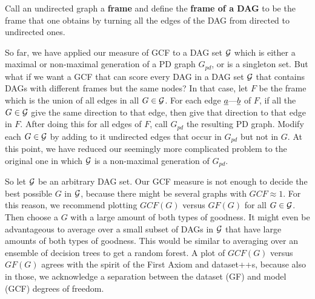 \documentclass[12pt]{article}
\begin{document}
Call an undirected graph a {\bf frame}
and define the
{\bf frame of a DAG}
to be the frame that one obtains
by turning
all the edges of the DAG from directed 
to undirected ones.

So far, we 
have applied our measure of
GCF to a DAG set ${\cal G}$
which is
either a maximal or 
non-maximal generation
of  a PD graph $G_{pd}$,
or is a singleton set.
But what if we want a GCF
that can score every DAG
in a  DAG set
${\cal G}$ that contains
DAGs with different frames
but the same nodes?
In that case, 
let $F$
be the frame
which 
is the union of 
all edges in all $G\in {\cal G}$.
For each edge ${\underline{a}}\text{---}{\underline{b}}$ of $F$,
if all the $G\in {\cal G}$
give the same direction
to that edge, then give that direction
to that edge in $F$.
After doing this for
all edges of $F$,
call $G_{pd} $ the resulting 
PD graph.
Modify each $G\in {\cal G}$
by adding to it undirected edges
that occur in $G_{pd}$
but not in $G$.
At this point,
we have reduced our
seemingly more 
complicated problem
to the original one
in which ${\cal G}$
is a non-maximal 
generation of $G_{pd}$.



So let ${\cal G}$
be an arbitrary DAG set.
Our GCF  measure
is not enough to
decide the best 
possible $G$ in ${\cal G}$,
because there might 
be several graphs with 
$GCF\approx 1$.
For this reason,
we recommend
plotting $GCF(G)$ 
versus $GF(G)$
for all $G\in{\cal G}$.
Then  choose a $G$ with a
large amount
of both types of goodness.
It might even be
advantageous to average over
a small subset of DAGs in  ${\cal G}$
that have large amounts of both
types of goodness.
This would be similar to  averaging
over an ensemble of decision trees to get 
a random forest.
A plot of 
$GCF(G)$
versus $GF(G)$
agrees with the spirit of
the First 
Axiom and dataset++s,
because also in those,
we acknowledge a separation between the
dataset (GF)  and model (GCF) degrees of freedom.



\end{document}
